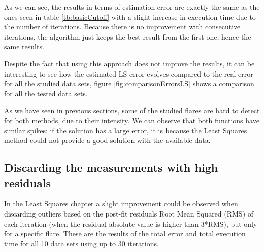 As we can see, the results in terms of estimation error are exactly the same as the ones seen in table \ref{tb:basicCutoff} with a slight increase in execution time due to the number of iterations. Because there is no improvement with consecutive iterations, the algorithm just keeps the best result from the first one, hence the same results.

Despite the fact that using this approach does not improve the results, it can be interesting to see how the estimated LS error evolves compared to the real error for all the studied data sets, figure \ref{fig:comparisonErrorsLS} shows a comparison for all the tested data sets.


As we have seen in previous sections, some of the studied flares are hard to detect for both methods, due to their intensity. We can observe that both functions have similar spikes: if the solution has a large error, it is because the Least Squares method could not provide a good solution with the available data. 

\subsection{Discarding the measurements with high residuals}

In the Least Squares chapter a slight improvement could be observed when discarding outliers based on the post-fit residuals Root Mean Squared (RMS) of each iteration (when the residual absolute value is higher than 3*RMS), but only for a specific flare. These are the results of the total error and total execution time for all 10 data sets using up to 30 iterations.

